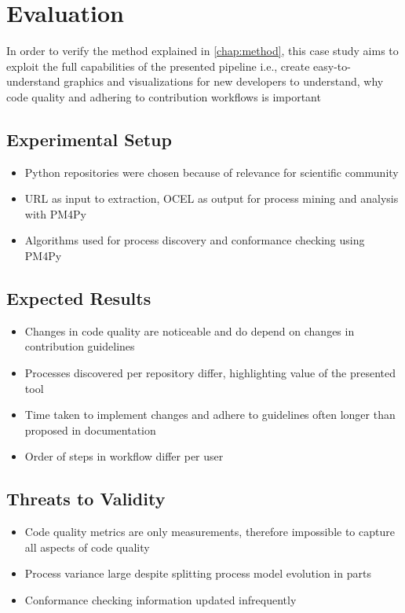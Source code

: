 \chapter{Evaluation}
\label{chap:eval}

In order to verify the method explained in \autoref{chap:method}, this case study aims to exploit the full capabilities of the presented pipeline i.e., create easy-to-understand graphics and visualizations for new developers to understand, why code quality and adhering to contribution workflows is important 

\section{Experimental Setup}
\begin{itemize}
	\item Python repositories were chosen because of relevance for scientific community
	\item URL as input to extraction, OCEL as output for process mining and analysis with PM4Py
	\item Algorithms used for process discovery and conformance checking using PM4Py
\end{itemize}

\section{Expected Results}
\begin{itemize}
	\item Changes in code quality are noticeable and do depend  on changes in contribution guidelines
	\item Processes discovered per repository differ, highlighting value of the presented tool
	\item Time taken to implement changes and adhere to guidelines often longer than proposed in documentation
	\item Order of steps in workflow differ per user
\end{itemize}

\section{Threats to Validity}
\begin{itemize}
	\item Code quality metrics are only measurements, therefore impossible to capture all aspects of code quality
	\item Process variance large despite splitting process model evolution in parts
	\item Conformance checking information updated infrequently %
\end{itemize}
